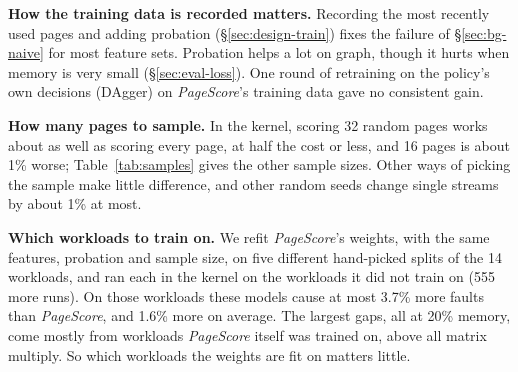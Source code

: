 \documentclass{article}
\DeclareRobustCommand{\pagescore}{\textit{PageScore}}
\newcommand{\finding}[1]{\textbf{#1}\hspace{0.4em}}
\begin{document}
\finding{How the training data is recorded matters.} Recording the most recently used pages and adding probation (\S\ref{sec:design-train}) fixes the failure of \S\ref{sec:bg-naive} for most feature sets. Probation helps a lot on graph, though it hurts when memory is very small (\S\ref{sec:eval-loss}). One round of retraining on the policy's own decisions (DAgger) on \pagescore{}'s training data gave no consistent gain.

\finding{How many pages to sample.} In the kernel, scoring 32 random pages works about as well as scoring every page, at half the cost or less, and 16 pages is about 1\% worse; Table~\ref{tab:samples} gives the other sample sizes. Other ways of picking the sample make little difference, and other random seeds change single streams by about 1\% at most.

\finding{Which workloads to train on.} We refit \pagescore{}'s weights, with the same features, probation and sample size, on five different hand-picked splits of the 14 workloads, and ran each in the kernel on the workloads it did not train on (555 more runs). On those workloads these models cause at most 3.7\% more faults than \pagescore{}, and 1.6\% more on average. The largest gaps, all at 20\% memory, come mostly from workloads \pagescore{} itself was trained on, above all matrix multiply. So which workloads the weights are fit on matters little.
\end{document}
